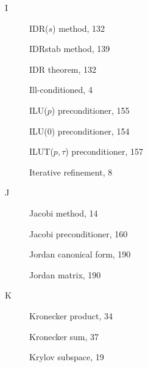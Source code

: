 \begin{description}
\item[I]
{IDR($s$) method}, {132}\par

{IDRstab method}, {139}\par

{IDR theorem}, {132}\par

{Ill-conditioned}, {4}\par

{ILU($p$) preconditioner}, {155}\par

{ILU(0) preconditioner}, {154}\par

{ILUT($p,\tau$) preconditioner}, {157}\par

{Iterative refinement}, {8}\par

\item[J]
{Jacobi method}, {14}\par

{Jacobi preconditioner}, {160}\par

{Jordan canonical form}, {190}\par

{Jordan matrix}, {190}\par

\item[K]
{Kronecker product}, {34}\par

{Kronecker sum}, {37}\par

{Krylov subspace}, {19}\par


\end{description}
